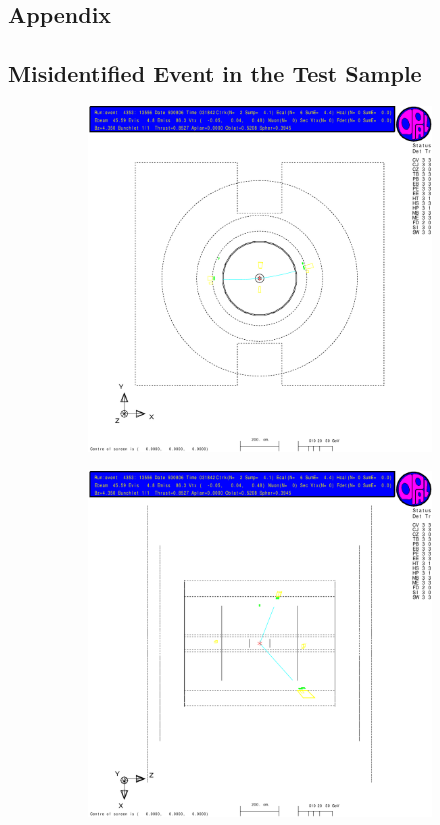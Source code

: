 \documentclass[11pt, a4paper]{article}
\numberwithin{equation}{section}
\begin{document}
\begin{appendix}
\newpage
\section{Appendix}

\subsection{Misidentified Event in the Test Sample}
\begin{figure}[h]
	\centering
	\begin{subfigure}{\textwidth}
		\centering
		\includegraphics[width=.9\textwidth]{./data/tag1/test_pics/cropped/test_03}
	\end{subfigure}
\end{figure}
\begin{figure}[h]
	\ContinuedFloat
	\begin{subfigure}{\textwidth}
		\centering
		\includegraphics[width=.9\textwidth]{./data/tag1/test_pics/cropped/test_03_side}

\end{subfigure}
\end{figure}
\end{appendix}
\end{document}
